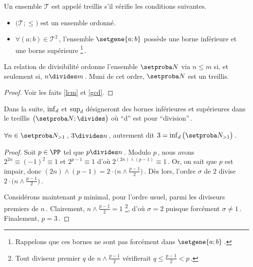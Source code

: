 Un ensemble $\mathcal{T}$ est appelé treillis s'il vérifie les conditions suivantes.
%
\begin{itemize}
	\item $\big( \mathcal{T} ; \leq \big)$ est un ensemble ordonné.

	\item $\forall (a ; b) \in \mathcal{T}^2$\,, l'ensemble $\setgene{a ; b}$ possède une borne inférieure et une borne supérieure
	\footnote{
		Rappelons que ces bornes ne sont pas forcément dans $\setgene{a ; b}$\,.
	}\,. 
\end{itemize}




\begin{fact}
	La relation de divisibilité ordonne l'ensemble $\ourset$ via $n  \leq m$ si, et seulement si, $n \divides m$\,.
	Muni de cet ordre, $\ourset$ est un treillis.
\end{fact}

\begin{proof}
	Voir les faits \ref{lcm} et \ref{gcd}.
\end{proof}


Dans la suite, $\inf_d$ et $\sup_d$ désigneront des bornes inférieures et supérieures dans le treillis $\big( \ourset ; \divides \big)$ où \enquote{d} est pour \enquote{division}\,.




\begin{fact}
	$\forall n \in \ourset_{>1}$\,, $3 \divides n$\,, autrement dit $3 = \dinf \big( \ourset_{>1} \big)$\,.
\end{fact}

\begin{proof}
	Soit $p \in \PP$ tel que $p \divides n$\,.
	Modulo $p$\,, nous avons
	$2^{2n} \equiv (- 1)^2 \equiv 1$
	et
	$2^{p-1} \equiv 1$
	d'où
	$2^{(2n) \wedge (p-1)} \equiv 1$\,.
	Or, on sait que $p$ est impair, donc $(2n) \wedge (p-1) = 2 \cdot \big( n \wedge \frac{p-1}{2} \big)$\,.
	Dès lors, l'ordre $\sigma$ de $2$ divise $2 \cdot \big( n \wedge \frac{p-1}{2} \big)$\,.
	
	\medskip
	
	Considérons maintenant $p$ minimal, pour l'ordre usuel, parmi les diviseurs premiers de $n$\,.
	Clairement, $n \wedge \frac{p-1}{2} = 1$
	\footnote{
		Tout diviseur premier $q$ de $n \wedge \frac{p-1}{2}$ vérifierait $q \leq \frac{p-1}{2} < p$\,.
	},
	d'où $\sigma = 2$ puisque forcément $\sigma \neq 1$\,.
	Finalement, $p = 3$\,.
\end{proof}


